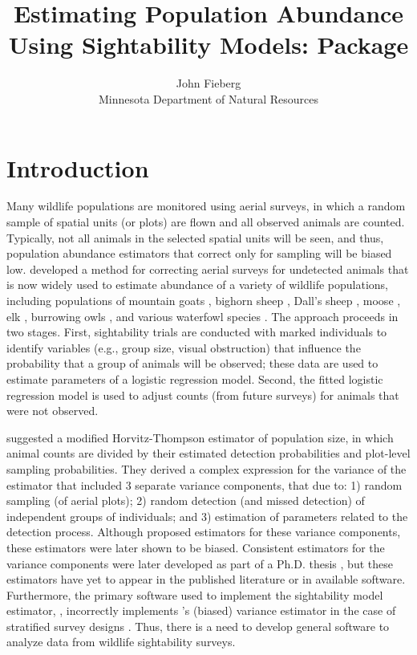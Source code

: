 \documentclass[nojss]{jss}
\author{John Fieberg\\Minnesota Department of Natural Resources}
\title{Estimating Population Abundance Using Sightability Models: \proglang{R} \pkg{SightabilityModel} Package}
\begin{document}
\section{Introduction}
Many wildlife populations are monitored using aerial surveys, in
which a random sample of spatial units (or plots) are flown and all
observed animals are counted.  Typically, not all animals in the
selected spatial units will be seen, and thus, population abundance estimators that
correct only for sampling will be biased low. \citet{SS1989}
developed a method for correcting aerial surveys for undetected
animals that is now widely
 used to estimate abundance of a variety of wildlife populations, including populations of
mountain goats \citep{Rice2009}, bighorn sheep \citep{Bodie1995},
Dall's sheep \citep{udevitz2006}, moose
\citep{Anderson1996,GiudFieb2011}, elk \citep{samuel1987, otten1993,
CoganDief1998, Lubow2002}, burrowing owls \citep{Manninginpress},
and various waterfowl species \citep{Pearse2008}.  The approach
proceeds in two stages. First, sightability trials are conducted
with marked individuals to identify variables (e.g., group size,
visual obstruction) that influence the probability that a group of
animals will be observed; these data are used to estimate parameters
of a logistic regression model. Second, the fitted logistic
regression model is used to adjust counts (from future surveys) for
animals that were not observed.

\citet{SS1989} suggested a modified Horvitz-Thompson estimator of
population size, in which animal counts are divided by their
estimated detection probabilities and plot-level sampling
probabilities.  They derived a complex expression for the variance
of the estimator that included 3 separate variance components, that
due to: 1) random sampling (of aerial plots);  2) random detection
(and missed detection) of independent groups of individuals; and  3)
estimation of parameters related to the detection process.  Although
\citet{SS1989} proposed estimators for these variance components,
these estimators were later shown to be biased. Consistent
estimators for the variance components were later developed as part
of a Ph.D. thesis \citep{Wong1996}, but these estimators have yet to
appear in the published literature or in available software.
Furthermore, the primary software used to implement the sightability
model estimator, 
\citep{Unsworth1999, Leban2007}, incorrectly implements
 \citet{SS1989}'s (biased) variance estimator  in the case of stratified survey designs
\citep{FiebGiud2008}.  Thus, there is a need to develop general
software to analyze data from wildlife sightability surveys.
\end{document}
